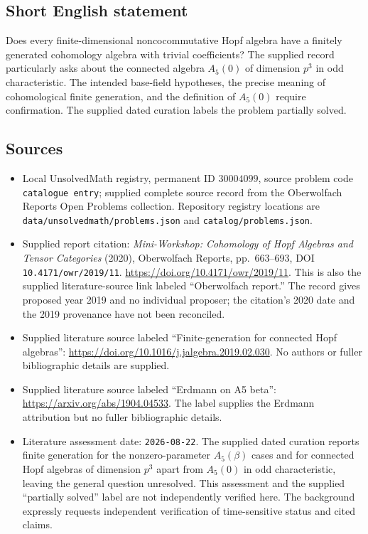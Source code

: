 \documentclass[11pt]{article}
\begin{document}
\subsection{Short English statement}
Does every finite-dimensional noncocommutative Hopf algebra have a finitely generated cohomology algebra with trivial coefficients? The supplied record particularly asks about the connected algebra \(A_5(0)\) of dimension \(p^3\) in odd characteristic. The intended base-field hypotheses, the precise meaning of cohomological finite generation, and the definition of \(A_5(0)\) require confirmation. The supplied dated curation labels the problem partially solved.
\subsection{Sources}
\begin{itemize}
\item Local UnsolvedMath registry, permanent ID \(30004099\), source problem code \texttt{catalogue entry}; supplied complete source record from the Oberwolfach Reports Open Problems collection. Repository registry locations are \texttt{data/unsolvedmath/problems.json} and \texttt{catalog/problems.json}.
\item Supplied report citation: \emph{Mini-Workshop: Cohomology of Hopf Algebras and Tensor Categories} (2020), Oberwolfach Reports, pp.\ 663--693, DOI \texttt{10.4171/owr/2019/11}. \url{https://doi.org/10.4171/owr/2019/11}. This is also the supplied literature-source link labeled ``Oberwolfach report.'' The record gives proposed year 2019 and no individual proposer; the citation's 2020 date and the 2019 provenance have not been reconciled.
\item Supplied literature source labeled ``Finite-generation for connected Hopf algebras'': \url{https://doi.org/10.1016/j.jalgebra.2019.02.030}. No authors or fuller bibliographic details are supplied.
\item Supplied literature source labeled ``Erdmann on A5 beta'': \url{https://arxiv.org/abs/1904.04533}. The label supplies the Erdmann attribution but no fuller bibliographic details.
\item Literature assessment date: \texttt{2026-08-22}. The supplied dated curation reports finite generation for the nonzero-parameter \(A_5(\beta)\) cases and for connected Hopf algebras of dimension \(p^3\) apart from \(A_5(0)\) in odd characteristic, leaving the general question unresolved. This assessment and the supplied ``partially solved'' label are not independently verified here. The background expressly requests independent verification of time-sensitive status and cited claims.
\end{itemize}
\end{document}
